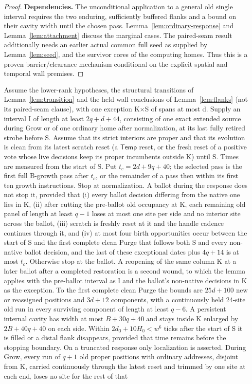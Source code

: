 \begin{proof}
\textbf{Dependencies.} The unconditional application to a general old single interval requires the two enduring, sufficiently buffered flanks and a bound on their cavity width until the chosen pass. Lemma~\ref{lem:ordinary-response} and Lemma~\ref{lem:attachment} discuss the marginal cases. The paired-seam result additionally needs an earlier actual common full seed as supplied by Lemma~\ref{lem:seed}, and the survivor cores of the computing homes. Thus this is a proven barrier/clearance mechanism conditional on the explicit spatial and temporal wall premises.
\end{proof}

\begin{lemma}\label{lem:local-wound}
Assume the lower-rank hypotheses, the structural transitions of Lemma~\ref{lem:transition} and the held-wall conclusions of Lemma~\ref{lem:flanks} (not its paired-seam clause), with one exception K\(\times\)S of spans at most d. Supply an interval I of length at least \(2q+d+44\), consisting of one exact extended source during Grow or of one ordinary home after normalization, at its last fully retired strobe before S. Assume that its strict interiors are proper and that its evolution is clean from its latest scratch reset (a \(\mathsf{Temp}\) reset, or the fresh reset of a positive vote whose live decisions keep its proper incumbents outside K) until S. Times are measured from the start of S. Put \(t_c=2d+9q+40\); the selected pass is the first full B-growth pass after \(t_c\), or the remainder of a pass then within its first ten growth instructions. Stop at normalization. A ballot during the response does not stop it, provided that (i) every ballot decision differing from the native one lies in K, (ii) after cutting the pre-ballot old occupancy at K, each remaining old panel of length at least \(q-1\) loses at most one site per side and no interior site across the ballot, (iii) scratch is freshly reset at it and the handle cadence continues through it, and (iv) at most four birth opportunities occur between the start of S and the first complete clean Purge that follows both S and every non-native ballot decision, and the last of these exceptional dates plus \(4q+14\) is at most \(t_c\). Otherwise stop at the ballot. A reopening of the same column K at a later ballot after a completed restoration is a second wound, to which the lemma applies with the pre-ballot interval as I and the ballot's non-native decisions in K as the exception. To the first complete clean Purge the bounds are \(25d+100\) new or reassigned positions and \(3d+12\) components, with a continuously held 24-site old run in every surviving component of length at least \(q-6\). A persistent internal cavity has width at most \(B+30q+40\) and stays inside K enlarged by \(2B+40q+40\) on each side. Within \(2d_0+10H_0<w^6\) ticks after the start of S it is filled or a distal flank disappears, provided that time remains before the stopping boundary. On a truncated response only localization is asserted. During Grow, every run of \(q+1\) old proper positions with ordinary addresses, disjoint from K, carried continuously through the latest reset and trimmed by one site at each end, loses no site for the rest of that 
\end{lemma}
